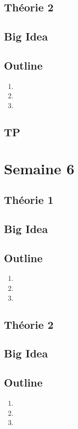\documentclass{article}
\begin{document}
\subsection{Théorie 2}
\subsection*{Big Idea}
\subsection*{Outline}
\begin{enumerate}
    \item
    \item
    \item
\end{enumerate}
\subsection{TP}

\pagebreak
\section{Semaine 6}
\subsection{Théorie 1}
\subsection*{Big Idea}
\subsection*{Outline}
\begin{enumerate}
    \item
    \item
    \item
\end{enumerate}
\subsection{Théorie 2}
\subsection*{Big Idea}
\subsection*{Outline}
\begin{enumerate}
    \item
    \item
    \item
\end{enumerate}
\end{document}
